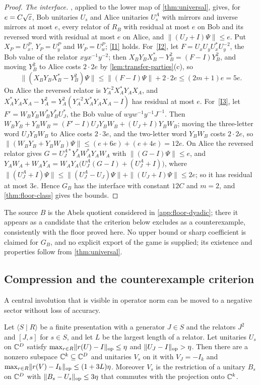 \begin{proof}
\emph{The interface.} , applied to the lower map of \cref{thm:universal}, gives, for $e=C\sqrt{\varepsilon}$, Bob unitaries
$U_s$ and Alice unitaries $U^A_s$ with mirrors and inverse mirrors at most $e$, every relator of $R_B$ with residual at most $e$ on Bob
and its reversed word with residual at most $e$ on Alice, and $\|(U_J+I)\Psi\|\le e$. Put $X_P=U^P_x$, $Y_P=U^P_y$ and $W_P=U^P_w$;
\ref{I1} holds. For~\ref{I2}, let $F=U_xU_yU_x^*U_y^{-2}$, the Bob value of the relator $xyx^{-1}y^{-2}$; then
$X_BY_BX_B^*-Y_B^2=(F-I)Y_B^2$, and moving $Y_B^2$ to Alice costs $2\cdot2e$ by \cref{lem:transfer-parties}(c), so
\[
\|(X_BY_BX_B^*-Y_B^2)\Psi\|\le\|(F-I)\Psi\|+2\cdot2e\le(2m+1)e=5e .
\]
On Alice the reversed relator is $Y_A^{-2}X_A^*Y_AX_A$, and $X_A^*Y_AX_A-Y_A^2=Y_A^2(Y_A^{-2}X_A^*Y_AX_A-I)$ has residual at most $e$. For~\ref{I3},
let $F'=W_BY_BW_B^*Y_B^*U_J^*$, the Bob value of $wyw^{-1}y^{-1}J^{-1}$. Then
$W_BY_B+Y_BW_B=(F'-I)U_JY_BW_B+(U_J+I)Y_BW_B$; moving the three-letter word $U_JY_BW_B$ to Alice costs $2\cdot3e$, and the two-letter
word $Y_BW_B$ costs $2\cdot2e$, so $\|(W_BY_B+Y_BW_B)\Psi\|\le(e+6e)+(e+4e)=12e$. On Alice the reversed relator gives
$G=U_J^{A*}Y_A^*W_A^*Y_AW_A$ with $\|(G-I)\Psi\|\le e$, and $Y_AW_A+W_AY_A=W_AY_A\bigl(U^A_J(G-I)+(U^A_J+I)\bigr)$, where
$\|(U^A_J+I)\Psi\|\le\|(U^A_J-U_J)\Psi\|+\|(U_J+I)\Psi\|\le2e$; so it has residual at most $3e$. Hence $G_B$ has the interface with
constant $12C$ and $m=2$, and \cref{thm:floor-class} gives the bounds.
\end{proof}

The source $B$ is the Abels quotient considered in \cref{app:floor-dyadic}; there it appears as a candidate that the criterion below
excludes as a counterexample, consistently with the floor proved here. No upper bound or sharp coefficient is claimed for $G_B$, and
no explicit export of the game is supplied; its existence and properties follow from \cref{thm:universal}.

\subsection{Compression and the counterexample criterion}\label{sec:floor-criterion}

A central involution that is visible in operator norm can be moved to a negative sector without loss of accuracy.

\begin{lemma}\label{lem:compression}
Let $\langle S\mid R\rangle$ be a finite presentation with a generator $J\in S$ and the relators $J^2$ and $[J,s]$ for $s\in S$, and
let $L$ be the largest length of a relator. Let unitaries $U_s$ on $\mathbb C^D$ satisfy $\max_{r\in R}\lVert r(U)-I\rVert_{\mathrm{op}}\le\eta$ and
$\lVert U_J-I\rVert_{\mathrm{op}}>\eta$. Then there are a nonzero subspace $\mathbb C^k\subseteq\mathbb C^D$ and unitaries $V_s$ on it with $V_J=-I_k$ and
$\max_{r\in R}\lVert r(V)-I_k\rVert_{\mathrm{op}}\le(1+3L)\eta$. Moreover $V_s$ is the restriction of a unitary $B_s$ on $\mathbb C^D$ with $\lVert B_s-U_s\rVert_{\mathrm{op}}\le3\eta$
that commutes with the projection onto $\mathbb C^k$.
\end{lemma}

